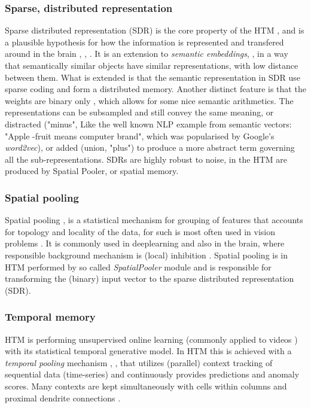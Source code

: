 \documentclass[a4,IEEEconf]{article}
\begin{document}
\subsubsection{Sparse, distributed representation}
Sparse distributed representation (SDR) \cite{Hinton:97} is the core property of the HTM \cite{journals/corr/AhmadH15}, and is a plausible hypothesis for how the information is represented and transfered around in the brain \cite{pmid26749189}, \cite{1508.04554v1}, \cite{CansinoMaquetDolanEtAl02}. It is an extension to \textit{semantic embeddings}\cite{liu-semantic-1997}, \cite{turney2010frequency}, \cite{journals/corr/abs-1105-2868} in a way that semantically similar objects have similar representations, with low distance between them. What is extended is that the semantic representation in SDR use sparse coding \cite{pmid21315595} and form a distributed memory. Another distinct feature is that the weights are binary only \cite{cond-mat/9604102v1}, which allows for some nice semantic arithmetics. The representations can be subsampled and still convey the same meaning, or distracted ("minus", Like the well known NLP example from semantic vectors: "Apple -fruit means computer brand", which was popularised by Google's \textit{word2vec}), or added (union, "plus") to produce a more abstract term governing all the sub-representations. SDRs are highly robust to noise, in the HTM are produced by Spatial Pooler, or spatial memory. 

\subsubsection{Spatial pooling}
Spatial pooling \cite{Hinton:97},\cite{BeckerHinton93} is a statistical mechanism for grouping of features that accounts for topology and locality of the data, for such is most often used in vision problems \cite{journals/corr/HeZR014}. It is commonly used in deeplearning and also in the brain, where responsible background mechanism is (local) inhibition \cite{devalois:inhibition}. Spatial pooling is in HTM performed by so called \textit{SpatialPooler} module and is responsible for transforming the (binary) input vector  to the sparse distributed representation (SDR).\cite{journals/corr/AhmadH15} 

\subsubsection{Temporal memory}
HTM is performing unsupervised online learning \cite{1504.02518v2} (commonly applied to videos \cite{journals/corr/PigouODHD15}) with its statistical temporal generative model. In HTM this is achieved with a \textit{temporal pooling} mechanism \cite{journals/ijon/HurriH03}, \cite{journals/corr/WangCSLS15}, \cite{SutskeverETAL:09} that utilizes (parallel) context tracking of sequential data (time-series) and continuously provides predictions and anomaly scores. Many contexts are kept simultaneously with cells within columns and proximal dendrite connections \cite{Hawkins:2010}.
  
\end{document}
